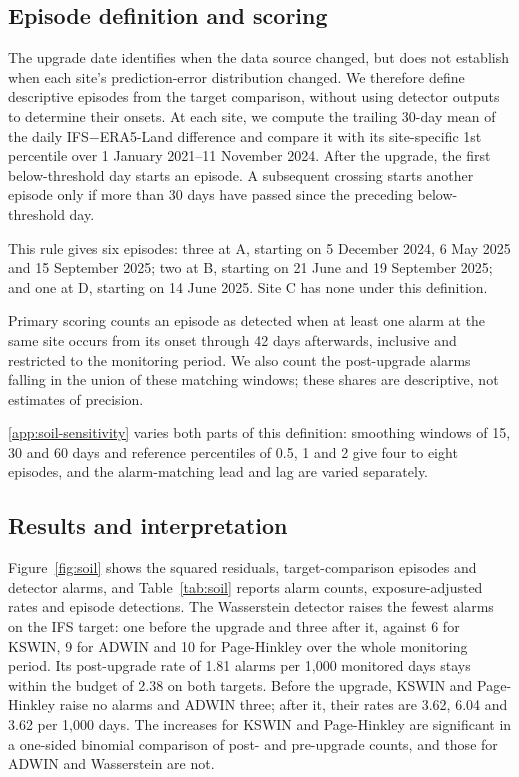 \documentclass[preprint,12pt]{elsarticle}
\begin{document}
\subsection{Episode definition and scoring}
\label{sec:soil-episodes}
The upgrade date identifies when the data source changed, but does not establish when each site's prediction-error distribution changed. We therefore define descriptive episodes from the target comparison, without using detector outputs to determine their onsets. At each site, we compute the trailing 30-day mean of the daily IFS$-$ERA5-Land difference and compare it with its site-specific 1st percentile over 1 January 2021--11 November 2024. After the upgrade, the first below-threshold day starts an episode. A subsequent crossing starts another episode only if more than 30 days have passed since the preceding below-threshold day.

This rule gives six episodes: three at A, starting on 5 December 2024, 6 May 2025 and 15 September 2025; two at B, starting on 21 June and 19 September 2025; and one at D, starting on 14 June 2025. Site C has none under this definition.

Primary scoring counts an episode as detected when at least one alarm at the same site occurs from its onset through 42 days afterwards, inclusive and restricted to the monitoring period. We also count the post-upgrade alarms falling in the union of these matching windows; these shares are descriptive, not estimates of precision.

\ref{app:soil-sensitivity} varies both parts of this definition: smoothing windows of 15, 30 and 60 days and reference percentiles of 0.5, 1 and 2 give four to eight episodes, and the alarm-matching lead and lag are varied separately.

\subsection{Results and interpretation}
\label{sec:soil-results}
Figure~\ref{fig:soil} shows the squared residuals, target-comparison episodes and detector alarms, and Table~\ref{tab:soil} reports alarm counts, exposure-adjusted rates and episode detections. The Wasserstein detector raises the fewest alarms on the IFS target: one before the upgrade and three after it, against 6 for KSWIN, 9 for ADWIN and 10 for Page-Hinkley over the whole monitoring period. Its post-upgrade rate of 1.81 alarms per 1,000 monitored days stays within the budget of 2.38 on both targets. Before the upgrade, KSWIN and Page-Hinkley raise no alarms and ADWIN three; after it, their rates are 3.62, 6.04 and 3.62 per 1,000 days. The increases for KSWIN and Page-Hinkley are significant in a one-sided binomial comparison of post- and pre-upgrade counts, and those for ADWIN and Wasserstein are not.
\end{document}
